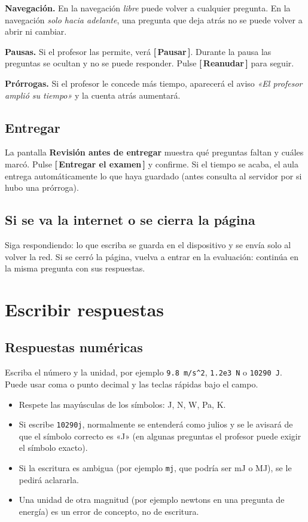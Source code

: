 \documentclass[11pt,a4paper,oneside]{book}
\newcommand{\boton}[1]{\textsf{\textbf{[\,#1\,]}}}
\begin{document}
\textbf{Navegación.} En la navegación \emph{libre} puede volver a cualquier pregunta. En la navegación
\emph{solo hacia adelante}, una pregunta que deja atrás no se puede volver a abrir ni cambiar.

\textbf{Pausas.} Si el profesor las permite, verá \boton{Pausar}. Durante la pausa las preguntas se ocultan y no se
puede responder. Pulse \boton{Reanudar} para seguir.

\textbf{Prórrogas.} Si el profesor le concede más tiempo, aparecerá el aviso \emph{«El profesor amplió su tiempo»} y
la cuenta atrás aumentará.

\section{Entregar}
La pantalla \textbf{Revisión antes de entregar} muestra qué preguntas faltan y cuáles marcó. Pulse
\boton{Entregar el examen} y confirme. Si el tiempo se acaba, el aula entrega automáticamente lo que haya guardado
(antes consulta al servidor por si hubo una prórroga).

\section{Si se va la internet o se cierra la página}
Siga respondiendo: lo que escriba se guarda en el dispositivo y se envía solo al volver la red. Si se cerró la página,
vuelva a entrar en la evaluación: continúa en la misma pregunta con sus respuestas.

\chapter{Escribir respuestas}

\section{Respuestas numéricas}
Escriba el número y la unidad, por ejemplo \texttt{9.8 m/s\textasciicircum2}, \texttt{1.2e3 N} o
\texttt{10290 J}. Puede usar coma o punto decimal y las teclas rápidas bajo el campo.

\begin{itemize}
  \item Respete las mayúsculas de los símbolos: J, N, W, Pa, K.
  \item Si escribe \texttt{10290j}, normalmente se entenderá como julios y se le avisará de que el símbolo
        correcto es «J» (en algunas preguntas el profesor puede exigir el símbolo exacto).
  \item Si la escritura es ambigua (por ejemplo \texttt{mj}, que podría ser mJ o MJ), se le pedirá aclararla.
  \item Una unidad de otra magnitud (por ejemplo newtons en una pregunta de energía) es un error de concepto, no de
        escritura.
\end{itemize}
\end{document}
